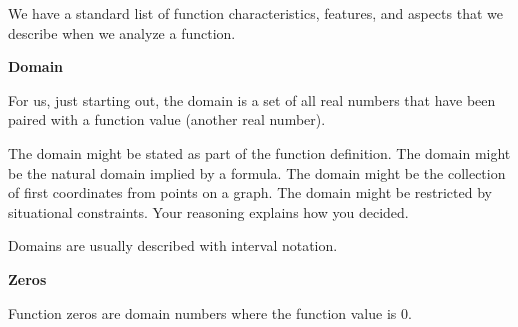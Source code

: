 \documentclass{ximera}
\begin{document}
We have a standard list of function characteristics, features, and aspects that we describe when we analyze a function. 





\begin{explanation}  \textbf{\textcolor{red!75!green}{Domain}} 

For us, just starting out, the domain is a set of all real numbers that have been paired with a function value (another real number). 


The domain might be stated as part of the function definition. The domain might be the natural domain implied by a formula.  The domain might be the collection of first coordinates from points on a graph.  The domain might be restricted by situational constraints. Your reasoning explains how you decided. 


Domains are usually described with interval notation.

\end{explanation}











\begin{explanation}  \textbf{\textcolor{red!75!green}{Zeros}} 

Function zeros are domain numbers where the function value is $0$.

\end{explanation}
\end{document}
